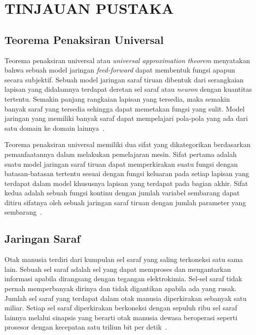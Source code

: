 

\chapter{TINJAUAN PUSTAKA}
\label{cha:2-TinjauanPustaka}

\section{Teorema Penaksiran Universal}
\label{sec:2-TeoremaPenaksiranUniversal}

Teorema penaksiran universal atau \textit{universal approximation theorem} menyatakan bahwa sebuah
model jaringan \textit{feed-forward} dapat membentuk fungsi apapun secara subjektif. Sebuah model
jaringan saraf tiruan dibentuk dari serangkaian lapisan yang didalamnya terdapat deretan sel saraf
atau \textit{neuron} dengan kuantitas tertentu. Semakin panjang rangkaian lapisan yang tersedia,
maka semakin banyak saraf yang tersedia sehingga dapat memetakan fungsi yang sulit.
Model jaringan yang memiliki banyak saraf dapat mempelajari pola-pola yang ada dari satu
domain ke domain lainnya~\cite{2016arXiv160100013G}.

Teorema penaksiran universal memiliki dua sifat yang dikategorikan berdasarkan pemanfaatannya dalam
melakukan pemelajaran mesin. Sifat pertama adalah suatu model jaringan saraf tiruan dapat
memperkirakan suatu fungsi dengan batasan-batasan tertentu sesuai dengan fungsi keluaran pada setiap
lapisan yang terdapat dalam model khususnya lapisan yang terdapat pada bagian akhir.
Sifat kedua adalah sebuah fungsi kontinu dengan jumlah variabel sembarang dapat
ditiru sifatnya oleh sebuah jaringan saraf tiruan dengan jumlah parameter yang sembarang~\cite{2019arXiv191003344K}.

\section{Jaringan Saraf}
\label{sec:2-JaringanSaraf}

Otak manusia terdiri dari kumpulan sel saraf yang saling terkoneksi satu sama lain. Sebuah sel saraf
adalah sel yang dapat memproses dan mengantarkan informasi apabila dirangsang dengan tegangan
elektrokimia. Sel-sel saraf tidak pernah memperbanyak dirinya dan tidak digantikan apabila ada yang
rusak. Jumlah sel saraf yang terdapat dalam otak manusia diperkirakan sebanyak satu miliar. Setiap
sel saraf diperkirakan berkoneksi dengan sepuluh ribu sel saraf lainnya melalui sinapsis yang
berarti otak manusia dewasa beroperasi seperti prosesor dengan kecepatan satu triliun bit per
detik~\cite{10.3389/neuro.09.031.2009}.

